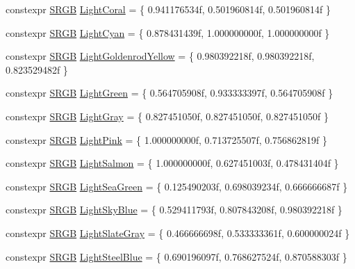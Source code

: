 \begin{DoxyCompactItemize}
\item 
constexpr \hyperlink{structmage_1_1_s_r_g_b}{S\+R\+GB} \hyperlink{namespacemage_1_1color_a8cadd437a344e0286c3f2575ba343b45}{Light\+Coral} = \{ 0.\+941176534f, 0.\+501960814f, 0.\+501960814f \}
\item 
constexpr \hyperlink{structmage_1_1_s_r_g_b}{S\+R\+GB} \hyperlink{namespacemage_1_1color_a910b1675afba007acc808663c033b5a8}{Light\+Cyan} = \{ 0.\+878431439f, 1.\+000000000f, 1.\+000000000f \}
\item 
constexpr \hyperlink{structmage_1_1_s_r_g_b}{S\+R\+GB} \hyperlink{namespacemage_1_1color_ae066f83c103109c2b2764cfefdb7dcd8}{Light\+Goldenrod\+Yellow} = \{ 0.\+980392218f, 0.\+980392218f, 0.\+823529482f \}
\item 
constexpr \hyperlink{structmage_1_1_s_r_g_b}{S\+R\+GB} \hyperlink{namespacemage_1_1color_a876dd8dc8b28b60bcb9b088d7eb52256}{Light\+Green} = \{ 0.\+564705908f, 0.\+933333397f, 0.\+564705908f \}
\item 
constexpr \hyperlink{structmage_1_1_s_r_g_b}{S\+R\+GB} \hyperlink{namespacemage_1_1color_a185dc26aaaed259e69cfab401acb1176}{Light\+Gray} = \{ 0.\+827451050f, 0.\+827451050f, 0.\+827451050f \}
\item 
constexpr \hyperlink{structmage_1_1_s_r_g_b}{S\+R\+GB} \hyperlink{namespacemage_1_1color_afd7de46670d9e2497b5ec6beac856ce9}{Light\+Pink} = \{ 1.\+000000000f, 0.\+713725507f, 0.\+756862819f \}
\item 
constexpr \hyperlink{structmage_1_1_s_r_g_b}{S\+R\+GB} \hyperlink{namespacemage_1_1color_ac5f1a50cde3527ea8b79516b754253c1}{Light\+Salmon} = \{ 1.\+000000000f, 0.\+627451003f, 0.\+478431404f \}
\item 
constexpr \hyperlink{structmage_1_1_s_r_g_b}{S\+R\+GB} \hyperlink{namespacemage_1_1color_ac664ce1e7cd3721eefcc51c6d7da0869}{Light\+Sea\+Green} = \{ 0.\+125490203f, 0.\+698039234f, 0.\+666666687f \}
\item 
constexpr \hyperlink{structmage_1_1_s_r_g_b}{S\+R\+GB} \hyperlink{namespacemage_1_1color_abd0ba374788da77ea7d1bac0095a9ec0}{Light\+Sky\+Blue} = \{ 0.\+529411793f, 0.\+807843208f, 0.\+980392218f \}
\item 
constexpr \hyperlink{structmage_1_1_s_r_g_b}{S\+R\+GB} \hyperlink{namespacemage_1_1color_adad3232eaac43b514b064428263271e9}{Light\+Slate\+Gray} = \{ 0.\+466666698f, 0.\+533333361f, 0.\+600000024f \}
\item 
constexpr \hyperlink{structmage_1_1_s_r_g_b}{S\+R\+GB} \hyperlink{namespacemage_1_1color_ab667892d618c565a7f143f291ee8cecc}{Light\+Steel\+Blue} = \{ 0.\+690196097f, 0.\+768627524f, 0.\+870588303f \}

\end{DoxyCompactItemize}
